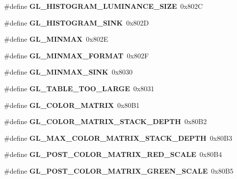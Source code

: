 \begin{DoxyCompactItemize}
\item 
\#define {\bfseries G\+L\+\_\+\+H\+I\+S\+T\+O\+G\+R\+A\+M\+\_\+\+L\+U\+M\+I\+N\+A\+N\+C\+E\+\_\+\+S\+I\+Z\+E}~0x802\+C\label{_s_d_l__opengl_8h_a699154088022f561f7c39b34e535069a}

\item 
\#define {\bfseries G\+L\+\_\+\+H\+I\+S\+T\+O\+G\+R\+A\+M\+\_\+\+S\+I\+N\+K}~0x802\+D\label{_s_d_l__opengl_8h_a9fbf1c60c5018d99f94dbab3f6c275e9}

\item 
\#define {\bfseries G\+L\+\_\+\+M\+I\+N\+M\+A\+X}~0x802\+E\label{_s_d_l__opengl_8h_ac47fcd809a49db130915a0b2da6795ac}

\item 
\#define {\bfseries G\+L\+\_\+\+M\+I\+N\+M\+A\+X\+\_\+\+F\+O\+R\+M\+A\+T}~0x802\+F\label{_s_d_l__opengl_8h_a4908c9eb24dfe46d85bf377a63175ef5}

\item 
\#define {\bfseries G\+L\+\_\+\+M\+I\+N\+M\+A\+X\+\_\+\+S\+I\+N\+K}~0x8030\label{_s_d_l__opengl_8h_abcfd969299540d4ef201e2d4152684c6}

\item 
\#define {\bfseries G\+L\+\_\+\+T\+A\+B\+L\+E\+\_\+\+T\+O\+O\+\_\+\+L\+A\+R\+G\+E}~0x8031\label{_s_d_l__opengl_8h_acb8af967f196db31e975a38467021707}

\item 
\#define {\bfseries G\+L\+\_\+\+C\+O\+L\+O\+R\+\_\+\+M\+A\+T\+R\+I\+X}~0x80\+B1\label{_s_d_l__opengl_8h_a30768d064fa99d8bb5996bafe7914612}

\item 
\#define {\bfseries G\+L\+\_\+\+C\+O\+L\+O\+R\+\_\+\+M\+A\+T\+R\+I\+X\+\_\+\+S\+T\+A\+C\+K\+\_\+\+D\+E\+P\+T\+H}~0x80\+B2\label{_s_d_l__opengl_8h_add7432a526d1858fb8e19c31574527eb}

\item 
\#define {\bfseries G\+L\+\_\+\+M\+A\+X\+\_\+\+C\+O\+L\+O\+R\+\_\+\+M\+A\+T\+R\+I\+X\+\_\+\+S\+T\+A\+C\+K\+\_\+\+D\+E\+P\+T\+H}~0x80\+B3\label{_s_d_l__opengl_8h_a00e586a66947fe6f51e0aec955ebf44a}

\item 
\#define {\bfseries G\+L\+\_\+\+P\+O\+S\+T\+\_\+\+C\+O\+L\+O\+R\+\_\+\+M\+A\+T\+R\+I\+X\+\_\+\+R\+E\+D\+\_\+\+S\+C\+A\+L\+E}~0x80\+B4\label{_s_d_l__opengl_8h_aaf54c3a8513abc52510d7e89b9e056d9}

\item 
\#define {\bfseries G\+L\+\_\+\+P\+O\+S\+T\+\_\+\+C\+O\+L\+O\+R\+\_\+\+M\+A\+T\+R\+I\+X\+\_\+\+G\+R\+E\+E\+N\+\_\+\+S\+C\+A\+L\+E}~0x80\+B5\label{_s_d_l__opengl_8h_a5cce706c60938c8abadc3adc82a41384}


\end{DoxyCompactItemize}
